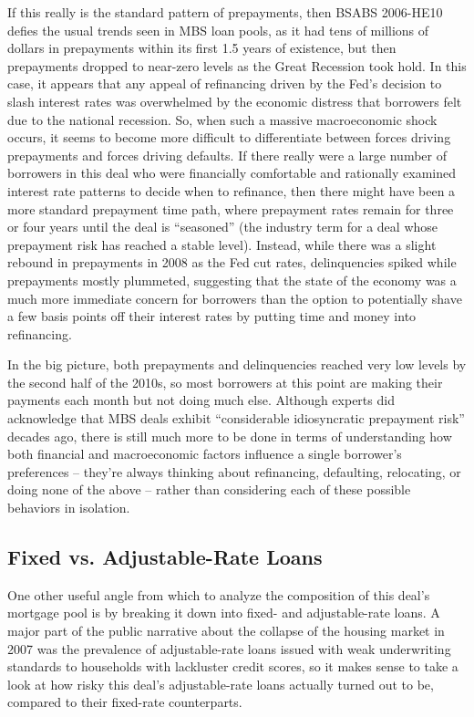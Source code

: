 \documentclass[12pt]{article}
\begin{document}
If this really is the standard pattern of prepayments, then BSABS 2006-HE10 defies the usual trends seen in MBS loan pools, as it had tens of millions of dollars in prepayments within its first 1.5 years of existence, but then prepayments dropped to near-zero levels as the Great Recession took hold.  In this case, it appears that any appeal of refinancing driven by the Fed's decision to slash interest rates was overwhelmed by the economic distress that borrowers felt due to the national recession. So, when such a massive macroeconomic shock occurs, it seems to become more difficult to differentiate between forces driving prepayments and forces driving defaults. If there really were a large number of borrowers in this deal who were financially comfortable and rationally examined interest rate patterns to decide when to refinance, then there might have been a more standard prepayment time path, where prepayment rates remain for three or four years until the deal is “seasoned” (the industry term for a deal whose prepayment risk has reached a stable level). Instead, while there was a slight rebound in prepayments in 2008 as the Fed cut rates, delinquencies spiked while prepayments mostly plummeted, suggesting that the state of the economy was a much more immediate concern for borrowers than the option to potentially shave a few basis points off their interest rates by putting time and money into refinancing.

In the big picture, both prepayments and delinquencies reached very low levels by the second half of the 2010s, so most borrowers at this point are making their payments each month but not doing much else. Although experts did acknowledge that MBS deals exhibit “considerable idiosyncratic prepayment risk” \parencite{becketti89} decades ago, there is still much more to be done in terms of understanding how both financial and macroeconomic factors influence a single borrower’s preferences – they’re always thinking about refinancing, defaulting, relocating, or doing none of the above – rather than considering each of these possible behaviors in isolation.

\subsection*{Fixed vs. Adjustable-Rate Loans}

One other useful angle from which to analyze the composition of this deal’s mortgage pool is by breaking it down into fixed- and adjustable-rate loans. A major part of the public narrative about the collapse of the housing market in 2007 was the prevalence of adjustable-rate loans issued with weak underwriting standards to households with lackluster credit scores, so it makes sense to take a look at how risky this deal’s adjustable-rate loans actually turned out to be, compared to their fixed-rate counterparts.
\end{document}
